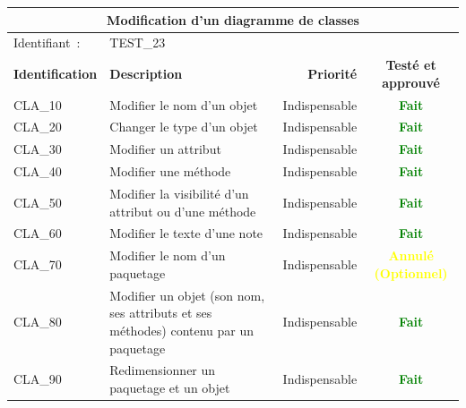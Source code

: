 \documentclass[hidelinks, a4paper,11pt,twoside,final]{article}
\begin{document}
\begin{center}
    \begin{tabular}{|l|p{8cm}|r|c|}
        \hline\multicolumn{4}{|c|}{Modification d’un diagramme de classes} \\\hline
        {Identifiant~:} & \multicolumn{3}{|p{10cm}|}{TEST\_23} \\\hline
        {\textbf{Identification}} & {\textbf{Description}} & {\textbf{Priorité}} & {\textbf{Testé et approuvé}}\\\hline
        {CLA\_10} & {Modifier le nom d’un objet} & {Indispensable} & {\textcolor{green}{\textbf{Fait}}} \\\hline
        {CLA\_20} & {Changer le type d’un objet} & {Indispensable} & {\textcolor{green}{\textbf{Fait}}} \\\hline
        {CLA\_30} & {Modifier un attribut} & {Indispensable} & {\textcolor{green}{\textbf{Fait}}} \\\hline
        {CLA\_40} & {Modifier une méthode} & {Indispensable} & {\textcolor{green}{\textbf{Fait}}} \\\hline
        {CLA\_50} & {Modifier la visibilité d’un attribut ou d’une méthode} & {Indispensable} & {\textcolor{green}{\textbf{Fait}}} \\\hline
        {CLA\_60} & {Modifier le texte d’une note} & {Indispensable} & {\textcolor{green}{\textbf{Fait}}} \\\hline
        {CLA\_70} & {Modifier le nom d’un paquetage} & {Indispensable} & {\textcolor{yellow}{\textbf{Annulé (Optionnel)}}} \\\hline
        {CLA\_80} & {Modifier un objet (son nom, ses attributs et ses méthodes) contenu par un paquetage} & {Indispensable} & {\textcolor{green}{\textbf{Fait}}} \\\hline
        {CLA\_90} & {Redimensionner un paquetage et un objet} & {Indispensable} & {\textcolor{green}{\textbf{Fait}}} \\\hline
    \end{tabular}
\end{center}
\end{document}
